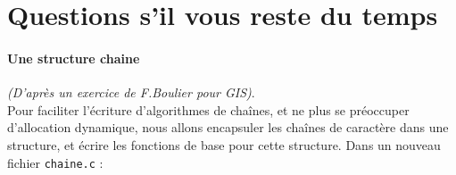\documentclass[final, pdftex, a4paper, openbib, ]{article}
\newcommand{\codes}{../codes/TP_Optionnel_allocation_memoire}
\begin{document}
%

\section{Questions s’il vous reste du temps}

\paragraph{Une structure chaine} \textit{(D'après un exercice de F.Boulier pour GIS)}.\\Pour faciliter l'écriture d'algorithmes
de chaînes, et ne plus se préoccuper d'allocation dynamique, nous allons encapsuler les chaînes de
caractère dans une structure, et écrire les fonctions de base pour cette structure.
Dans un nouveau fichier \texttt{chaine.c} :
\end{document}
